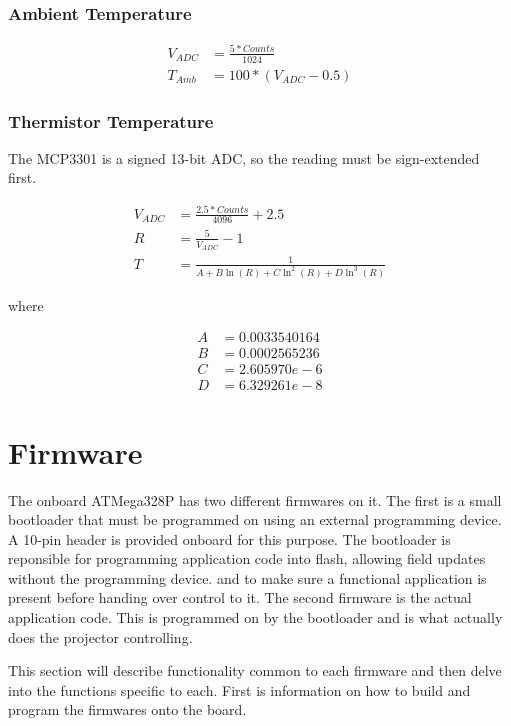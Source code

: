 \documentclass{article}
\begin{document}
\subsubsection{Ambient Temperature}
\begin{align*}
    V_{ADC} &= \frac{5 * Counts}{1024} \\
    T_{Amb} &= 100 * (V_{ADC} - 0.5)
\end{align*}

\subsubsection{Thermistor Temperature}
The MCP3301 is a signed 13-bit ADC, so the reading must be sign-extended first.

\begin{align*}
    V_{ADC} &= \frac{2.5 * Counts}{4096} + 2.5 \\
    R &= \frac{5}{V_{ADC}} - 1 \\
    T &= \frac{1}{A + B\ln(R) + C\ln^2(R) + D\ln^3(R)}
\end{align*}

where

\begin{align*}
    A &= 0.0033540164 \\
    B &= 0.0002565236 \\
    C &= 2.605970e-6 \\
    D &= 6.329261e-8
\end{align*}


\section{Firmware} \label{sec:Firmware}
The onboard ATMega328P has two different firmwares on it.  The first is a small bootloader that must
be programmed on using an external programming device.  A 10-pin header is provided onboard for this
purpose.  The bootloader is reponsible for programming application code into flash, allowing field
updates without the programming device. and to make sure a functional application is present before
handing over control to it.  The second firmware is the actual application code.  This is programmed
on by the bootloader and is what actually does the projector controlling.

This section will describe functionality common to each firmware and then delve into the functions
specific to each.  First is information on how to build and program the firmwares onto the board.
\end{document}
